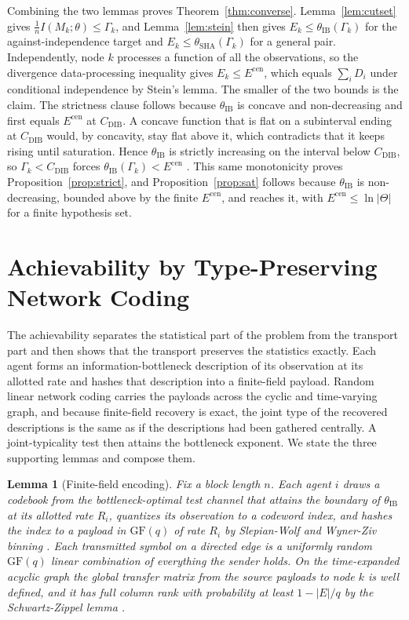 \documentclass[journal]{IEEEtran}
\newtheorem{lemma}{Lemma}
\theoremstyle{definition}
\theoremstyle{remark}
\newcommand{\Ecen}{E^{\mathrm{cen}}}
\newcommand{\tib}{\theta_{\mathrm{IB}}}
\newcommand{\tsha}{\theta_{\mathrm{SHA}}}
\newcommand{\Gk}{\Gamma_k}
\newcommand{\Cdib}{C_{\mathrm{DIB}}}
\begin{document}
Combining the two lemmas proves Theorem~\ref{thm:converse}. Lemma~\ref{lem:cutset} gives $\tfrac1n
I(M_k;\theta)\le\Gk$, and Lemma~\ref{lem:stein} then gives $E_k\le\tib(\Gk)$ for the against-independence target
and $E_k\le\tsha(\Gk)$ for a general pair. Independently, node $k$ processes a function of all the observations,
so the divergence data-processing inequality gives $E_k\le\Ecen$, which equals $\sum_i D_i$ under conditional
independence by Stein's lemma. The smaller of the two bounds is the claim. The strictness clause follows because
$\tib$ is concave and non-decreasing and first equals $\Ecen$ at $\Cdib$. A concave function that is flat on a
subinterval ending at $\Cdib$ would, by concavity, stay flat above it, which contradicts that it keeps rising
until saturation. Hence $\tib$ is strictly increasing on the interval below $\Cdib$, so $\Gk<\Cdib$ forces
$\tib(\Gk)<\Ecen$ \cite{giladbachrach2003}. This same monotonicity proves Proposition~\ref{prop:strict}, and
Proposition~\ref{prop:sat} follows because $\tib$ is non-decreasing, bounded above by the finite $\Ecen$, and
reaches it, with $\Ecen\le\ln|\Theta|$ for a finite hypothesis set.

\section{Achievability by Type-Preserving Network Coding}\label{sec:achieve}
The achievability separates the statistical part of the problem from the transport part and then shows that the
transport preserves the statistics exactly. Each agent forms an information-bottleneck description of its
observation at its allotted rate and hashes that description into a finite-field payload. Random linear network
coding carries the payloads across the cyclic and time-varying graph, and because finite-field recovery is exact,
the joint type of the recovered descriptions is the same as if the descriptions had been gathered centrally. A
joint-typicality test then attains the bottleneck exponent. We state the three supporting lemmas and compose them.

\begin{lemma}[Finite-field encoding]\label{lem:encode}
Fix a block length $n$. Each agent $i$ draws a codebook from the bottleneck-optimal test channel that attains the
boundary of $\tib$ at its allotted rate $R_i$, quantizes its observation to a codeword index, and hashes the
index to a payload in $\mathrm{GF}(q)$ of rate $R_i$ by Slepian-Wolf and Wyner-Ziv binning \cite{slepianwolf1973,%
wynerziv1976,berger1978}. Each transmitted symbol on a directed edge is a uniformly random $\mathrm{GF}(q)$ linear
combination of everything the sender holds. On the time-expanded acyclic graph the global transfer matrix from the
source payloads to node $k$ is well defined, and it has full column rank with probability at least $1-|E|/q$ by
the Schwartz-Zippel lemma \cite{schwartz1980,zippel1979,ho2006}.
\end{lemma}
\end{document}
